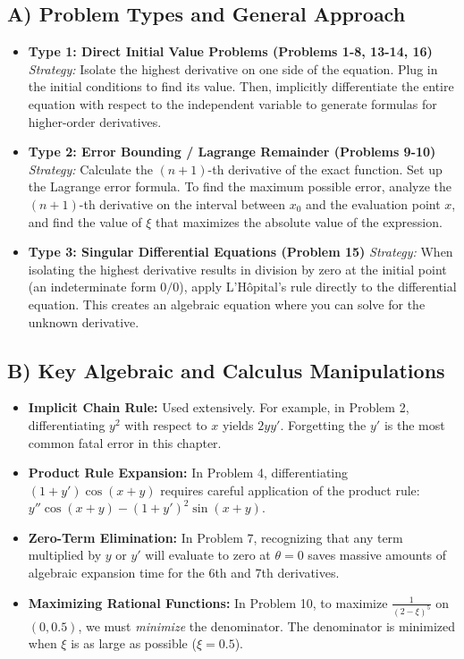 \documentclass[11pt, letterpaper]{article}
\theoremstyle{definition}
\theoremstyle{remark}
\begin{document}
\subsection{A) Problem Types and General Approach}
\begin{itemize}
    \item \textbf{Type 1: Direct Initial Value Problems (Problems 1-8, 13-14, 16)}
    \textit{Strategy:} Isolate the highest derivative on one side of the equation. Plug in the initial conditions to find its value. Then, implicitly differentiate the entire equation with respect to the independent variable to generate formulas for higher-order derivatives.
    
    \item \textbf{Type 2: Error Bounding / Lagrange Remainder (Problems 9-10)}
    \textit{Strategy:} Calculate the $(n+1)$-th derivative of the exact function. Set up the Lagrange error formula. To find the maximum possible error, analyze the $(n+1)$-th derivative on the interval between $x_0$ and the evaluation point $x$, and find the value of $\xi$ that maximizes the absolute value of the expression.
    
    \item \textbf{Type 3: Singular Differential Equations (Problem 15)}
    \textit{Strategy:} When isolating the highest derivative results in division by zero at the initial point (an indeterminate form $0/0$), apply L'Hôpital's rule directly to the differential equation. This creates an algebraic equation where you can solve for the unknown derivative.
\end{itemize}

\subsection{B) Key Algebraic and Calculus Manipulations}
\begin{itemize}
    \item \textbf{Implicit Chain Rule:} Used extensively. For example, in Problem 2, differentiating $y^2$ with respect to $x$ yields $2yy'$. Forgetting the $y'$ is the most common fatal error in this chapter.
    \item \textbf{Product Rule Expansion:} In Problem 4, differentiating $(1+y')\cos(x+y)$ requires careful application of the product rule: $y''\cos(x+y) - (1+y')^2\sin(x+y)$.
    \item \textbf{Zero-Term Elimination:} In Problem 7, recognizing that any term multiplied by $y$ or $y'$ will evaluate to zero at $\theta=0$ saves massive amounts of algebraic expansion time for the 6th and 7th derivatives.
    \item \textbf{Maximizing Rational Functions:} In Problem 10, to maximize $\frac{1}{(2-\xi)^5}$ on $(0, 0.5)$, we must \textit{minimize} the denominator. The denominator is minimized when $\xi$ is as large as possible ($\xi = 0.5$).
\end{itemize}
\end{document}

